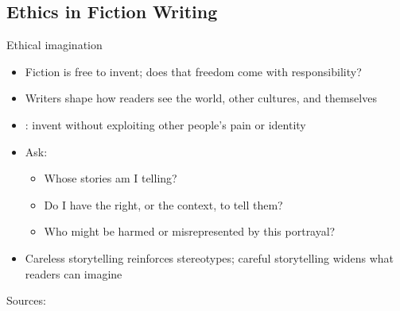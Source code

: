 \documentclass[aspectratio=169]{beamer}
\begin{document}
\subsection{Ethics in Fiction Writing}

\begin{frame}{Ethical imagination}
\begin{itemize}
  \item Fiction is free to invent; does that freedom come with responsibility?
  \item Writers shape how readers see the world, other cultures, and themselves
  \item {}: invent without exploiting other people's pain or identity
  \item Ask:
    \begin{itemize}
      \item Whose stories am I telling?
      \item Do I have the right, or the context, to tell them?
      \item Who might be harmed or misrepresented by this portrayal?
    \end{itemize}
  \item Careless storytelling reinforces stereotypes; careful storytelling widens what readers can imagine
\end{itemize}

\medskip
\small Sources: \citep{hachette2021guidediversity, haynes2021ethicsaesthetics, leclerc2024writing}
\end{frame}
\end{document}

